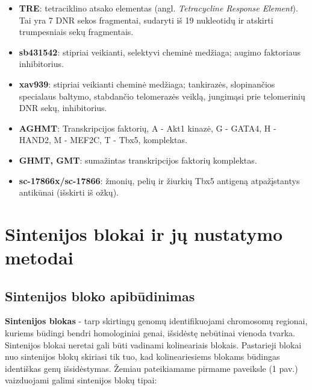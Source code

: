 \documentclass[12pt]{article}
\begin{document}
\begin{itemize}
    \item \textbf{TRE}: tetraciklino atsako elementas (angl. \emph{Tetracycline
        Response Element}). Tai yra 7 DNR sekos fragmentai,
        sudaryti iš 19 nukleotidų ir atskirti trumpesniais sekų fragmentais.
    \item \textbf{sb431542}: stipriai veikianti, selektyvi cheminė medžiaga;
        augimo faktoriaus inhibitorius.
    \item \textbf{xav939}: stipriai veikianti cheminė medžiaga; tankirazės,
        slopinančios specialaus baltymo, stabdančio telomerazės veiklą,
        jungimąsi prie telomerinių DNR sekų, inhibitorius.
    \item \textbf{AGHMT}: Transkripcijos faktorių, A - Akt1 kinazė, G - GATA4,
        H - HAND2, M - MEF2C, T - Tbx5, komplektas.
    \item \textbf{GHMT, GMT}: sumažintas transkripcijos faktorių
        komplektas.
    \item \textbf{sc-17866x/sc-17866}: žmonių, pelių ir žiurkių Tbx5 antigeną
        atpažįstantys antikūnai (išskirti iš ožkų).
\end{itemize}


\section{Sintenijos blokai ir jų nustatymo metodai}
\subsection{Sintenijos bloko apibūdinimas}

\textbf{Sintenijos blokas} - tarp skirtingų genomų identifikuojami chromosomų
regionai, kuriems būdingi bendri homologiniai genai, išsidėstę nebūtinai
vienoda tvarka. Sintenijos blokai neretai gali būti vadinami kolineariais
blokais. Pastarieji blokai nuo sintenijos blokų skiriasi tik tuo, kad
kolineariesiems blokams būdingas identiškas genų išsidėstymas. Žemiau
pateikiamame pirmame paveiksle (1 pav.) vaizduojami galimi sintenijos blokų
tipai:
\end{document}
